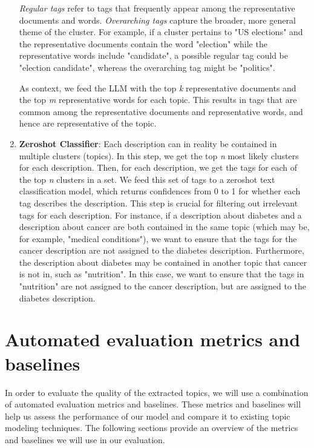 \begin{enumerate}
    \textit{Regular tags} refer to tags that frequently appear among the representative documents and words. \textit{Overarching tags} capture the broader, more general theme of the cluster. For example, if a cluster pertains to "US elections" and the representative documents contain the word "election" while the representative words include "candidate", a possible regular tag could be "election candidate", whereas the overarching tag might be "politics".

    As context, we feed the LLM with the top \textit{k} representative documents and the top \textit{m} representative words for each topic. This results in tags that are common among the representative documents and representative words, and hence are representative of the topic.
    \item \textbf{Zeroshot Classifier}: Each description can in reality be contained in multiple clusters (topics). In this step, we get the top \textit{n} most likely clusters for each description. Then, for each description, we get the tags for each of the top \textit{n} clusters in a set. We feed this set of tags to a zeroshot text classification model, which returns confidences from 0 to 1 for whether each tag describes the description. This step is crucial for filtering out irrelevant tags for each description. For instance, if a description about diabetes and a description about cancer are both contained in the same topic (which may be, for example, "medical conditions"), we want to ensure that the tags for the cancer description are not assigned to the diabetes description. Furthermore, the description about diabetes may be contained in another topic that cancer is not in, such as "nutrition". In this case, we want to ensure that the tags in "nutrition" are not assigned to the cancer description, but are assigned to the diabetes description.

\end{enumerate}


\section{Automated evaluation metrics and baselines}
\label{sec:automated_evaluation}
In order to evaluate the quality of the extracted topics, we will use a combination of automated evaluation metrics and baselines. These metrics and baselines will help us assess the performance of our model and compare it to existing topic modeling techniques. The following sections provide an overview of the metrics and baselines we will use in our evaluation.

